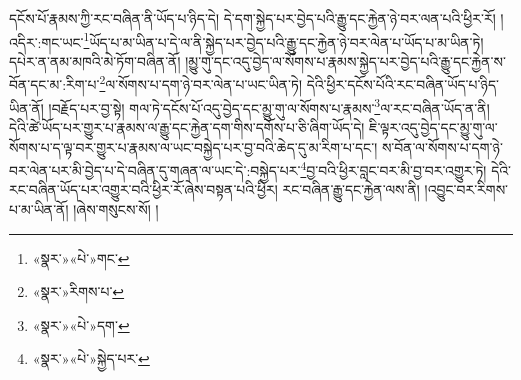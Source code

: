 དངོས་པོ་རྣམས་ཀྱི་རང་བཞིན་ནི་ཡོད་པ་ཉིད་དེ། དེ་དག་སྐྱེད་པར་བྱེད་པའི་རྒྱུ་དང་རྐྱེན་ཉེ་བར་ལན་པའི་ཕྱིར་རོ། །འདིར་:གང་ཡང་\footnote{«སྣར་»«པེ་»གང་}ཡོད་པ་མ་ཡིན་པ་དེ་ལ་ནི་སྐྱེད་པར་བྱེད་པའི་རྒྱུ་དང་རྐྱེན་ཉེ་བར་ལེན་པ་ཡོད་པ་མ་ཡིན་ཏེ། དཔེར་ན་ནམ་མཁའི་མེ་ཏོག་བཞིན་ནོ། །མྱུ་གུ་དང་འདུ་བྱེད་ལ་སོགས་པ་རྣམས་སྐྱེད་པར་བྱེད་པའི་རྒྱུ་དང་རྐྱེན་ས་བོན་དང་མ་:རིག་པ་\footnote{«སྣར་»རིགས་པ་}ལ་སོགས་པ་དག་ཉེ་བར་ལེན་པ་ཡང་ཡིན་ཏེ། དེའི་ཕྱིར་དངོས་པོའི་རང་བཞིན་ཡོད་པ་ཉིད་ཡིན་ནོ། །བརྗོད་པར་བྱ་སྟེ། གལ་ཏེ་དངོས་པོ་འདུ་བྱེད་དང་མྱུ་གུ་ལ་སོགས་པ་རྣམས་\footnote{«སྣར་»«པེ་»དག་}ལ་རང་བཞིན་ཡོད་ན་ནི། དེའི་ཚེ་ཡོད་པར་གྱུར་པ་རྣམས་ལ་རྒྱུ་དང་རྐྱེན་དག་གིས་དགོས་པ་ཅི་ཞིག་ཡོད་དེ། ཇི་ལྟར་འདུ་བྱེད་དང་མྱུ་གུ་ལ་སོགས་པ་ད་ལྟ་བར་གྱུར་པ་རྣམས་ལ་ཡང་བསྐྱེད་པར་བྱ་བའི་ཆེད་དུ་མ་རིག་པ་དང་། ས་བོན་ལ་སོགས་པ་དག་ཉེ་བར་ལེན་པར་མི་བྱེད་པ་དེ་བཞིན་དུ་གཞན་ལ་ཡང་དེ་:བསྐྱེད་པར་\footnote{«སྣར་»«པེ་»སྐྱེད་པར་}བྱ་བའི་ཕྱིར་བླང་བར་མི་བྱ་བར་འགྱུར་ཏེ། དེའི་རང་བཞིན་ཡོད་པར་འགྱུར་བའི་ཕྱིར་རོ་ཞེས་བསྟན་པའི་ཕྱིར། རང་བཞིན་རྒྱུ་དང་རྐྱེན་ལས་ནི། །འབྱུང་བར་རིགས་པ་མ་ཡིན་ནོ། །ཞེས་གསུངས་སོ། །
